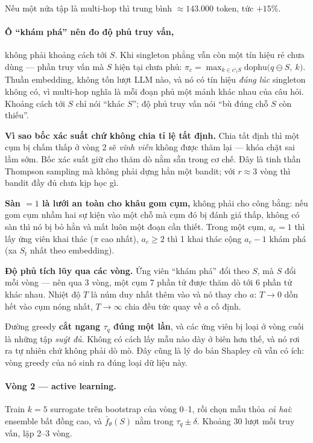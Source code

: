 \documentclass[11pt,a4paper]{article}
\begin{document}
Nếu một nửa tập là multi-hop thì trung bình ${\approx}143.000$ token, tức $+15\%$.

\paragraph{Ô ``khám phá'' nên đo độ phủ truy vấn,} không phải khoảng cách tới $S$. Khi
singleton phẳng vẫn còn một tín hiệu rẻ chưa dùng --- phần truy vấn mà $S$ hiện tại chưa phủ:
$\pi_c=\max_{k\in c\setminus S}\mathrm{dophu}\big(q\ominus S,\ k\big)$. Thuần embedding,
không tốn lượt LLM nào, và nó có tín hiệu \emph{đúng lúc} singleton không có, vì multi-hop
nghĩa là mỗi đoạn phủ một mảnh khác nhau của câu hỏi. Khoảng cách tới $S$ chỉ nói ``khác
$S$''; độ phủ truy vấn nói ``bù đúng chỗ $S$ còn thiếu''.

\textbf{Vì sao bốc xác suất chứ không chia tỉ lệ tất định.} Chia tất định thì một cụm bị
chấm thấp ở vòng 2 sẽ \emph{vĩnh viễn} không được thăm lại --- khóa chặt sai lầm sớm. Bốc
xác suất giữ cho thăm dò nằm sẵn trong cơ chế. Đây là tinh thần Thompson sampling mà không
phải dựng hẳn một bandit; với $r\approx 3$ vòng thì bandit đầy đủ chưa kịp học gì.

\textbf{Sàn $=1$ là lưới an toàn cho khâu gom cụm,} không phải cho công bằng: nếu gom cụm
nhầm hai sự kiện vào một chỗ mà cụm đó bị đánh giá thấp, không có sàn thì nó bị bỏ hẳn và
mất luôn một đoạn cần thiết. Trong một cụm, $a_c=1$ thì lấy ứng viên khai thác ($\pi$ cao
nhất), $a_c\ge 2$ thì 1 khai thác cộng $a_c-1$ khám phá (xa $S_t$ nhất theo embedding).

\textbf{Độ phủ tích lũy qua các vòng.} Ứng viên ``khám phá'' đổi theo $S$, mà $S$ đổi mỗi
vòng --- nên qua 3 vòng, một cụm 7 phần tử được thăm dò tới 6 phần tử khác nhau. Nhiệt độ
$T$ là núm duy nhất thêm vào và nó thay cho $a$: $T\to 0$ dồn hết vào cụm nóng nhất,
$T\to\infty$ chia đều tức quay về $a$ cố định.

Đường greedy \textbf{cắt ngang $\tau_q$ đúng một lần}, và các ứng viên bị loại ở vòng cuối
là những tập \emph{suýt đủ}. Không có cách lấy mẫu nào dày ở biên hơn thế, và nó rơi ra tự
nhiên chứ không phải dò mò. Đây cũng là lý do bản Shapley cũ vẫn có ích: vòng greedy của nó
sinh ra đúng loại dữ liệu này.

\paragraph{Vòng 2 --- active learning.} Train $k=5$ surrogate trên bootstrap của vòng 0--1,
rồi chọn mẫu thỏa \emph{cả hai}: ensemble bất đồng cao, và $\bar f_\theta(S)$ nằm trong
$\tau_q\pm\delta$. Khoảng 30 lượt mỗi truy vấn, lặp 2--3 vòng.
\end{document}
